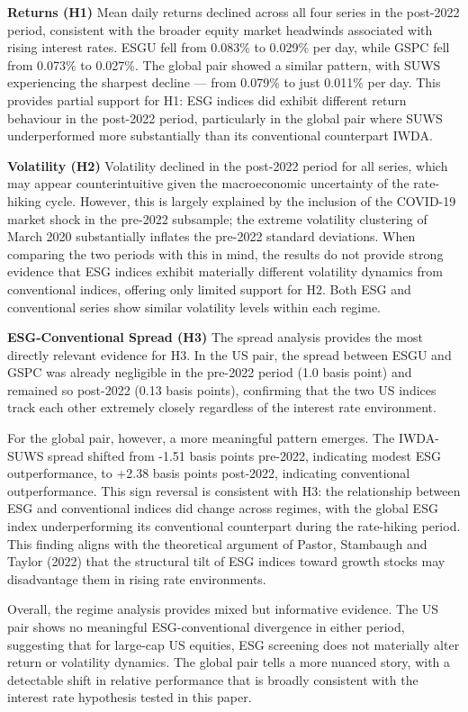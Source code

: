 \documentclass[
]{article}
\begin{document}
\textbf{Returns (H1)} Mean daily returns declined across all four series
in the post-2022 period, consistent with the broader equity market
headwinds associated with rising interest rates. ESGU fell from 0.083\%
to 0.029\% per day, while GSPC fell from 0.073\% to 0.027\%. The global
pair showed a similar pattern, with SUWS experiencing the sharpest
decline --- from 0.079\% to just 0.011\% per day. This provides partial
support for H1: ESG indices did exhibit different return behaviour in
the post-2022 period, particularly in the global pair where SUWS
underperformed more substantially than its conventional counterpart
IWDA.

\textbf{Volatility (H2)} Volatility declined in the post-2022 period for
all series, which may appear counterintuitive given the macroeconomic
uncertainty of the rate-hiking cycle. However, this is largely explained
by the inclusion of the COVID-19 market shock in the pre-2022 subsample;
the extreme volatility clustering of March 2020 substantially inflates
the pre-2022 standard deviations. When comparing the two periods with
this in mind, the results do not provide strong evidence that ESG
indices exhibit materially different volatility dynamics from
conventional indices, offering only limited support for H2. Both ESG and
conventional series show similar volatility levels within each regime.

\textbf{ESG-Conventional Spread (H3)} The spread analysis provides the
most directly relevant evidence for H3. In the US pair, the spread
between ESGU and GSPC was already negligible in the pre-2022 period (1.0
basis point) and remained so post-2022 (0.13 basis points), confirming
that the two US indices track each other extremely closely regardless of
the interest rate environment.

For the global pair, however, a more meaningful pattern emerges. The
IWDA-SUWS spread shifted from -1.51 basis points pre-2022, indicating
modest ESG outperformance, to +2.38 basis points post-2022, indicating
conventional outperformance. This sign reversal is consistent with H3:
the relationship between ESG and conventional indices did change across
regimes, with the global ESG index underperforming its conventional
counterpart during the rate-hiking period. This finding aligns with the
theoretical argument of Pastor, Stambaugh and Taylor (2022) that the
structural tilt of ESG indices toward growth stocks may disadvantage
them in rising rate environments.

Overall, the regime analysis provides mixed but informative evidence.
The US pair shows no meaningful ESG-conventional divergence in either
period, suggesting that for large-cap US equities, ESG screening does
not materially alter return or volatility dynamics. The global pair
tells a more nuanced story, with a detectable shift in relative
performance that is broadly consistent with the interest rate hypothesis
tested in this paper.
\end{document}
